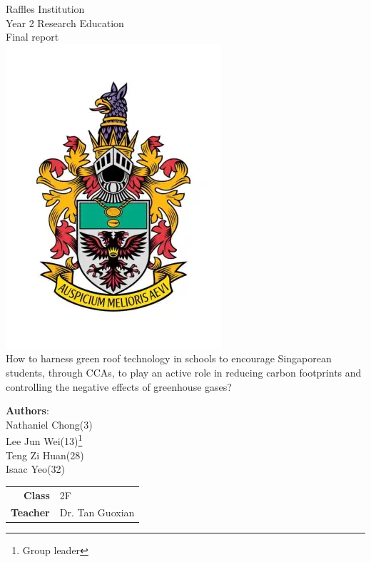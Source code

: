 \documentclass[a4paper]{article}
\begin{document}
\begin{titlepage}
  \centering
  \Large{Raffles Institution \\ Year 2 Research Education \\ Final report} \\
  \includegraphics[scale=0.5]{ri-school-crest.png} \\
  \huge{How to harness green roof technology in schools to encourage
    Singaporean students, through CCAs, to play an active role in reducing
    carbon footprints and controlling the negative effects of greenhouse
    gases?
  } \\
  \vspace{1cm}
  \large{
    \textbf{Authors}: \\
    Nathaniel Chong(3) \\
    Lee Jun Wei(13)\footnote{Group leader} \\
    Teng Zi Huan(28) \\
    Isaac Yeo(32) \\
    \vspace{1cm}
    \begin{tabular}{r@{:}l}
      \textbf{Class} & \hspace{1cm} 2F \\
      \textbf{Teacher} & \hspace{1cm} Dr. Tan Guoxian \\
    \end{tabular}
  }
\end{titlepage}
\end{document}
